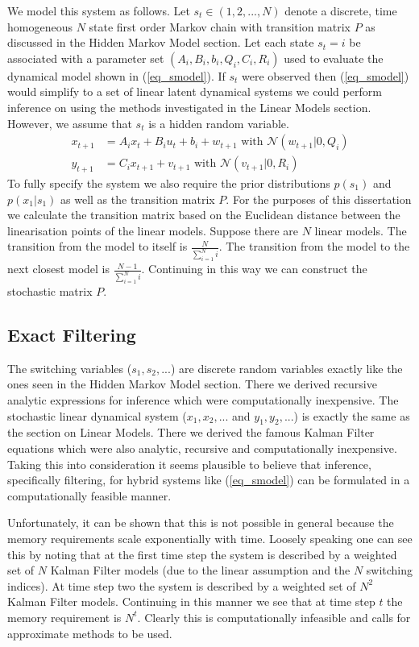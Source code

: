 \documentclass[../masters.tex]{subfiles}
\begin{document}
We model this system as follows. Let $s_t \in (1,2,..., N)$ denote a discrete, time homogeneous $N$ state first order Markov chain with transition matrix $P$ as discussed in the Hidden Markov Model section. Let each state $s_t=i$ be associated with a parameter set $\left(A_i, B_i, b_i, Q_i, C_i, R_i \right)$ used to evaluate the dynamical model shown in (\ref{eq_smodel}). If $s_t$ were observed then (\ref{eq_smodel}) would simplify to a set of linear latent dynamical systems we could perform inference on using the methods investigated in the Linear Models section. However, we assume that $s_t$ is a hidden random variable.
\begin{equation}
\begin{aligned}
x_{t+1} &= A_ix_t + B_iu_t + b_i + w_{t+1} \text{ with } \mathcal{N}(w_{t+1}|0,Q_i) \\
y_{t+1} &= C_ix_{t+1} + v_{t+1}  \text{ with } \mathcal{N}(v_{t+1}|0,R_i)
\end{aligned}
\label{eq_smodel}
\end{equation}
To fully specify the system we also require the prior distributions $p(s_1)$ and $p(x_1|s_1)$ as well as the transition matrix $P$. For the purposes of this dissertation we calculate the transition matrix based on the Euclidean distance between the linearisation points of the linear models. Suppose there are $N$ linear models. The transition from the model to itself is $\frac{N}{\sum_{i=1}^N i}$. The transition from the model to the next closest model is $\frac{N-1}{\sum_{i=1}^N i}$. Continuing in this way we can construct the stochastic matrix $P$.

\subsection{Exact Filtering}
The switching variables ($s_1, s_2,...$) are discrete random variables exactly like the ones seen in the Hidden Markov Model section. There we derived recursive analytic expressions for inference which were computationally inexpensive. The stochastic linear dynamical system ($x_1,x_2,...$ and $y_1, y_2,...$) is exactly the same as the section on Linear Models. There we derived the famous Kalman Filter equations which were also analytic, recursive and computationally inexpensive. Taking this into consideration it seems plausible to believe that inference, specifically filtering, for hybrid systems like (\ref{eq_smodel}) can be formulated in a computationally feasible manner. 

Unfortunately, it can be shown that this is not possible in general \cite{lerner}\cite{murphy3} because the memory requirements scale exponentially with time. Loosely speaking one can see this by noting that at the first time step the system is described by a weighted set of $N$ Kalman Filter models (due to the linear assumption and the $N$ switching indices). At time step two the system is described by a weighted set of $N^2$ Kalman Filter models. Continuing in this manner we see that at time step $t$ the memory requirement is $N^t$. Clearly this is computationally infeasible and calls for approximate methods to be used. 
\end{document}
